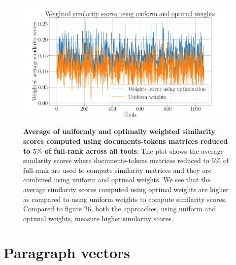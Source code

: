 \begin{figure}[h]
\begin{centering}
    {\includegraphics[scale=0.4]{figures/Optimization_005_lsi.pdf}}
    \caption[Average of uniformly and optimally weighted similarity scores computed using documents-tokens matrices reduced to $5\%$ of full-rank across all tools]{\textbf{Average of uniformly and optimally weighted similarity scores computed using documents-tokens matrices reduced to $5\%$ of full-rank across all tools}: The plot shows the average similarity scores where documents-tokens matrices reduced to $5\%$ of full-rank are used to compute similarity matrices and they are combined using uniform and optimal weights. We see that the average similarity scores computed using optimal weights are higher as compared to using uniform weights to compute similarity scores. Compared to figure 26, both the approaches, using uniform and optimal weights, measure higher similarity scores. }
\end{centering}
\end{figure}


\section{Paragraph vectors}

